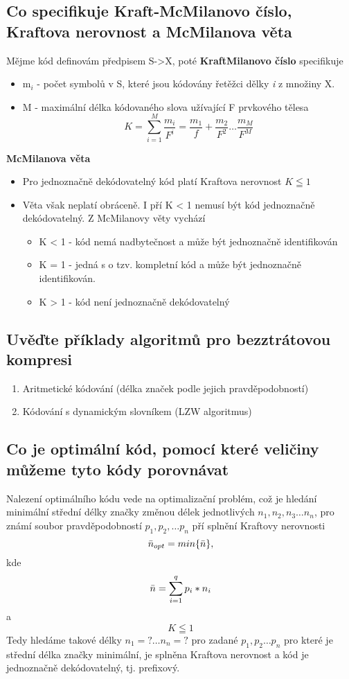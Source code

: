 \subsection{Co specifikuje Kraft-McMilanovo číslo, Kraftova nerovnost a McMilanova věta}
Mějme kód definovám předpisem S->X, poté \textbf{KraftMilanovo číslo} specifikuje
\begin{itemize}
    \item m$_i$ - počet symbolů v S, které jsou kódovány řetěžci dělky \emph{i} z množiny X.
    \item M - maximální délka kódovaného slova užívající F prvkového tělesa
    $$K = \sum_{i=1}^M \frac{m_i}{F^i}= \frac{m_1}{f} + \frac{m_2}{F^2} \dots \frac{m_M}{F^M}$$
\end{itemize}
\textbf{McMilanova věta}
\begin{itemize}
    \item Pro jednoznačně dekódovatelný kód platí Kraftova nerovnost $K \leqq 1$
    \item Věta však neplatí obráceně.
    I pří K < 1 nemusí být kód jednoznačně dekódovatelný.
    Z McMilanovy věty vychází
    \begin{itemize}
        \item K < 1 - kód nemá nadbytečnost a může být jednoznačně identifikován
        \item K = 1 - jedná s o tzv. kompletní kód a může být jednoznačně identifikován.
        \item K > 1 - kód není jednoznačně dekódovatelný
    \end{itemize}
\end{itemize}
\subsection{Uvěďte příklady algoritmů pro bezztrátovou kompresi}
\begin{enumerate}
    \item Aritmetické kódování (délka značek podle jejich pravděpodobností)
    \item Kódování s dynamickým slovníkem (LZW algoritmus)
\end{enumerate}

\subsection{Co je optimální kód, pomocí které veličiny můžeme tyto kódy porovnávat}
Nalezení optimálního kódu vede  na optimalizační problém, což je hledání minimální střední délky značky změnou délek jednotlivých $n_1, n_2, n_3 \dots n_n$, pro známí soubor pravděpodobností $p_1, p_2, \dots p_n$ pří splnění Kraftovy nerovnosti
$$\Bar{n}_{opt} = min \{\Bar{n}\},$$ kde
$$\Bar{n}=\sum_{i=1}^q p_i*n_i$$ a 
$$K\leqq1$$
Tedy hledáme takové délky $n_1=? \dots n_n=?$ pro zadané $p_1,p_2\dots p_n$ pro které je střední délka značky minimální, je splněna Kraftova nerovnost a kód je jednoznačně dekódovatelný, tj. prefixový.

